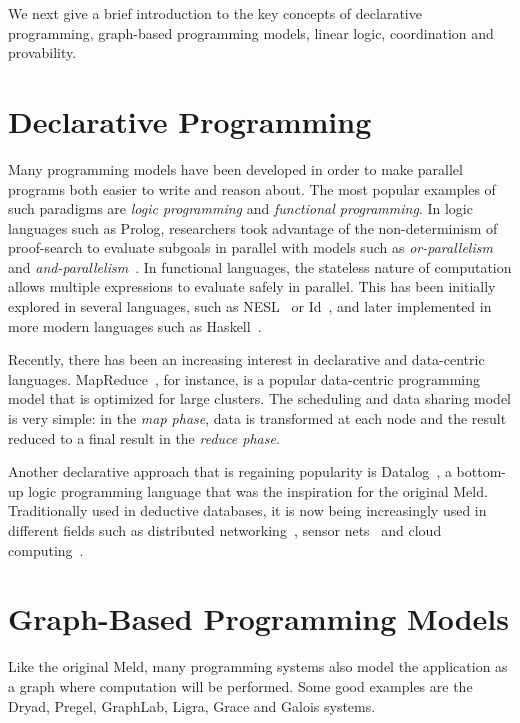 We next give a brief introduction to the key concepts of declarative
programming, graph-based programming models, linear logic, coordination and
provability.

\section{Declarative Programming}

Many programming models have been developed in order to make parallel programs
both easier to write and reason about. The most popular examples of such
paradigms are \emph{logic programming} and \emph{functional programming}.  In
logic languages such as Prolog, researchers took advantage of the
non-determinism of proof-search to evaluate subgoals in parallel with models
such as \emph{or-parallelism} and
\emph{and-parallelism}~\cite{Gupta:2001:PEP:504083.504085}.  In functional
languages, the stateless nature of computation allows multiple expressions to
evaluate safely in parallel.  This has been initially explored in several
languages, such as NESL~\cite{Blelloch:1996:PPA:227234.227246} or
Id~\cite{Nikhil93anoverview}, and later implemented in more modern languages
such as Haskell~\cite{Chakravarty07dataparallel}.

Recently, there has been an increasing interest in declarative and data-centric
languages.  MapReduce~\cite{Dean:2008:MSD:1327452.1327492}, for instance, is a
popular data-centric programming model that is optimized for large clusters. The
scheduling and data sharing model is very simple: in the \emph{map phase}, data
is transformed at each node and the result reduced to a final result in the
\emph{reduce phase}.

Another declarative approach that is regaining popularity is
Datalog~\cite{Ullman:1990:PDK:533142}, a bottom-up logic programming language
that was the inspiration for the original Meld.  Traditionally used in deductive
databases, it is now being increasingly used in different fields such as
distributed networking~\cite{Loo-condie-garofalakis-p2}, sensor
nets~\cite{Chu:2007:DID:1322263.1322281} and cloud computing~\cite{alvaro:boom}.

\section{Graph-Based Programming Models}

Like the original Meld, many programming systems also model the application as a
graph where computation will be performed.  Some good examples are the Dryad,
Pregel, GraphLab, Ligra, Grace and Galois systems.

